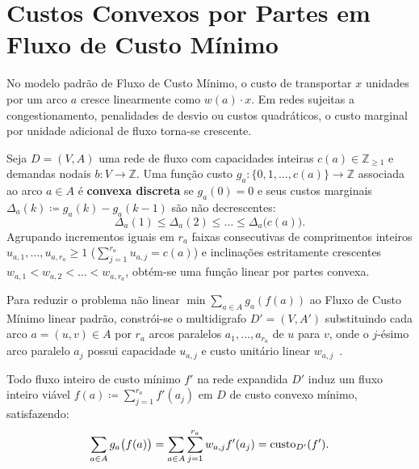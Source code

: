 \section{Custos Convexos por Partes em Fluxo de Custo Mínimo}\label{sec:custos_convexos}

No modelo padrão de Fluxo de Custo Mínimo, o custo de transportar $x$ unidades por um arco $a$ cresce linearmente como $w(a) \cdot x$. Em redes sujeitas a congestionamento, penalidades de desvio ou custos quadráticos, o custo marginal por unidade adicional de fluxo torna-se crescente.

\begin{definicao}
Seja $D = (V, A)$ uma rede de fluxo com capacidades inteiras $c(a) \in \mathbb{Z}_{\ge 1}$ e demandas nodais $b: V \to \mathbb{Z}$. Uma função custo $g_a: \{0, 1, \dots, c(a)\} \to \mathbb{Z}$ associada ao arco $a \in A$ é \textbf{convexa discreta} se $g_a(0) = 0$ e seus custos marginais $\Delta_a(k) \coloneqq g_a(k) - g_a(k - 1)$ são não decrescentes:
\begin{equation}
    \Delta_a(1) \le \Delta_a(2) \le \dots \le \Delta_a\bigl(c(a)\bigr).
\end{equation}
Agrupando incrementos iguais em $r_a$ faixas consecutivas de comprimentos inteiros $u_{a,1}, \dots, u_{a,r_a} \ge 1$ ($\sum_{j=1}^{r_a} u_{a,j} = c(a)$) e inclinações estritamente crescentes $w_{a,1} < w_{a,2} < \dots < w_{a,r_a}$, obtém-se uma função linear por partes convexa.
\end{definicao}

Para reduzir o problema não linear $\min \sum_{a \in A} g_a(f(a))$ ao Fluxo de Custo Mínimo linear padrão, constrói-se o multidigrafo $D' = (V, A')$ substituindo cada arco $a = (u, v) \in A$ por $r_a$ arcos paralelos $a_1, \dots, a_{r_a}$ de $u$ para $v$, onde o $j$-ésimo arco paralelo $a_j$ possui capacidade $u_{a,j}$ e custo unitário linear $w_{a,j}$~\cite{ahuja1993network}.

\begin{teorema}
Todo fluxo inteiro de custo mínimo $f'$ na rede expandida $D'$ induz um fluxo inteiro viável $f(a) \coloneqq \sum_{j=1}^{r_a} f'(a_j)$ em $D$ de custo convexo mínimo, satisfazendo:
\begin{equation}
    \sum_{a \in A} g_a\bigl(f(a)\bigr) = \sum_{a \in A} \sum_{j=1}^{r_a} w_{a,j} f'(a_j) = \operatorname{custo}_{D'}(f').
\end{equation}
\end{teorema}

